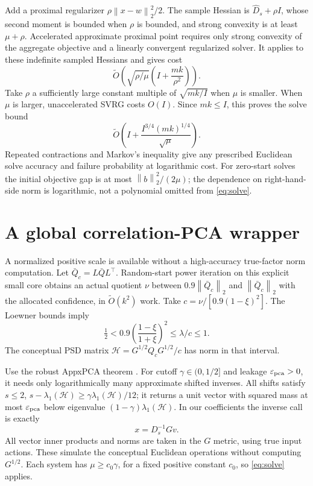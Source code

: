 \documentclass[11pt]{article}
\newcommand{\norm}[1]{\left\lVert#1\right\rVert}
\newcommand{\tO}{\widetilde O}
\begin{document}
Add a proximal regularizer \(\rho\norm{x-w}_2^2/2\).
The sample Hessian is \(\widehat D_s+\rho I\), whose second moment is
bounded when \(\rho\) is bounded, and strong convexity is at least
\(\mu+\rho\).
Accelerated approximate proximal point \cite[Theorem 1.1]{frostig}
requires only strong convexity of the aggregate objective and a
linearly convergent regularized solver. It applies to these indefinite
sampled Hessians and gives cost
\[
 \tO\!\left(\sqrt{\rho/\mu}
               \left(I+\frac{mk}{\rho^2}\right)\right).
\]
Take \(\rho\) a sufficiently large constant multiple of
\(\sqrt{mk/I}\) when \(\mu\) is smaller. When \(\mu\) is larger,
unaccelerated SVRG costs \(O(I)\).
Since \(mk\leq I\), this proves the solve bound
\begin{equation}\label{eq:solve}
 \tO\!\left(I+\frac{I^{3/4}(mk)^{1/4}}{\sqrt\mu}\right).
\end{equation}
Repeated contractions and Markov's inequality give any prescribed
Euclidean solve accuracy and failure probability at logarithmic cost.
For zero-start solves the initial objective gap is at most
\(\norm b_2^2/(2\mu)\); the dependence on right-hand-side norm is
logarithmic, not a polynomial omitted from \eqref{eq:solve}.

\section{A global correlation-PCA wrapper}
A normalized positive scale is available without a high-accuracy
true-factor norm computation. Let \(\bar Q_c=L\bar QL^\top\).
Random-start power iteration on this explicit small core obtains an
actual quotient \(\nu\) between
\(0.9\norm{\bar Q_c}_2\) and \(\norm{\bar Q_c}_2\) with the allocated
confidence, in \(\widetilde O(k^2)\) work.
Take \(c=\nu/[0.9(1-\xi)^2]\). The Loewner bounds imply
\[
 \tfrac12<0.9\left(\frac{1-\xi}{1+\xi}\right)^2
                  \leq \lambda/c\leq1 .
\]
The conceptual PSD matrix
\(\mathcal H=G^{1/2}Q_cG^{1/2}/c\) has norm in that interval.

Use the robust AppxPCA theorem \cite[Theorem 3.1]{lazysvd}.
For cutoff \(\gamma\in(0,1/2]\) and leakage \(\varepsilon_{\rm pca}>0\),
it needs only logarithmically many approximate shifted inverses.
All shifts satisfy \(s\leq2\),
\(s-\lambda_1(\mathcal H)\geq\gamma\lambda_1(\mathcal H)/12\);
it returns a unit vector with squared mass at most
\(\varepsilon_{\rm pca}\) below eigenvalue
\((1-\gamma)\lambda_1(\mathcal H)\).
In our coefficients the inverse call is exactly
\[
 x=D_s^{-1}Gv.
\]
All vector inner products and norms are taken in the \(G\) metric,
using true input actions. These simulate the conceptual Euclidean
operations without computing \(G^{1/2}\).
Each system has \(\mu\geq c_0\gamma\), for a fixed positive constant
\(c_0\), so \eqref{eq:solve} applies.
\end{document}
